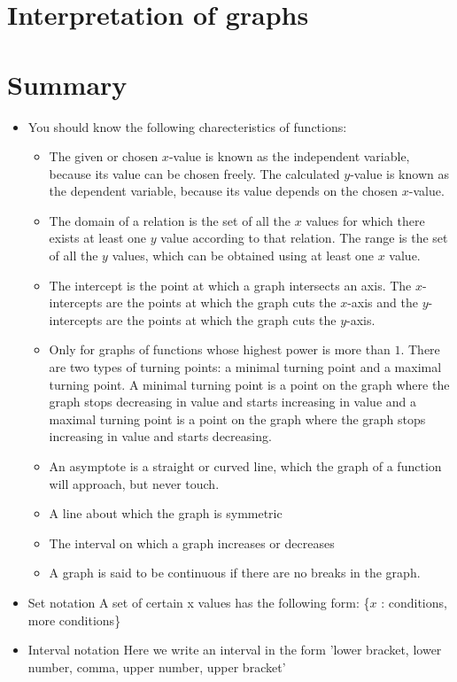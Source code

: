 \section{Interpretation of graphs}
\section{Summary}
\nopagebreak
\begin{itemize}[noitemsep]
\item You should know the following charecteristics of functions: 
\begin{itemize}[noitemsep]
\item The given or chosen $x$-value is known as the independent variable, because its value can be chosen freely. The calculated $y$-value is known as the dependent variable, because its value depends on the chosen $x$-value.
\item The domain of a relation is the set of all the $x$ values for which there exists at least one $y$ value according to that relation. The range is the set of all the $y$ values, which can be obtained using at least one $x$ value.
\item The intercept is the point at which a graph intersects an axis. The $x$-intercepts are the points at which the graph cuts the $x$-axis and the $y$-intercepts are the points at which the graph cuts the $y$-axis. 
\item Only for graphs of functions whose highest power is more than $1$. There are two types of turning points: a minimal turning point and a maximal turning point. A minimal turning point is a point on the graph where the graph stops decreasing in value and starts increasing in value and a maximal turning point is a point on the graph where the graph stops increasing in value and starts decreasing. 
\item An asymptote is a straight or curved line, which the graph of a function will approach, but never touch.
\item A line about which the graph is symmetric
\item  The interval on which a graph increases or decreases\item A graph is said to be continuous if there are no breaks in the graph. 
\end{itemize}
\item 
Set notation
A set of certain x values has the following form: \{$x$ : conditions, more conditions\}
\item 
Interval notation
Here we write an interval in the form 'lower bracket, lower number, comma, upper number, upper bracket'

\end{itemize}
